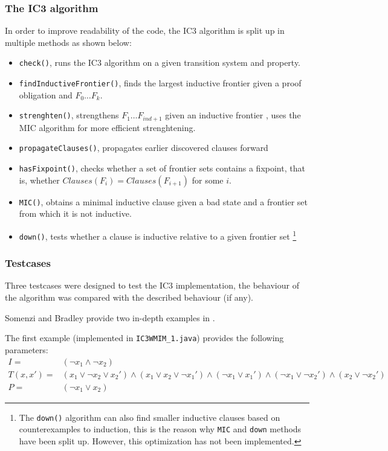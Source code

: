 \documentclass[a4paper]{article}
\begin{document}
\subsubsection{The IC3 algorithm}
In order to improve readability of the code, the IC3 algorithm is split up in multiple methods as shown below:

\begin{itemize}
\item \texttt{check()}, runs the IC3 algorithm on a given transition system and property.
\item \texttt{findInductiveFrontier()}, finds the largest inductive frontier given a proof obligation and $F_0 \ldots F_k$.
\item \texttt{strenghten()}, strengthens $F_1 \ldots F_{ind+1}$ given an inductive frontier	, uses the MIC algorithm for more efficient strenghtening.
\item \texttt{propagateClauses()}, propagates earlier discovered clauses forward
\item \texttt{hasFixpoint()}, checks whether a set of frontier sets contains a fixpoint, that is, whether $Clauses(F_i) = Clauses(F_{i+1})$ for some $i$.
\item \texttt{MIC()}, obtains a minimal inductive clause given a bad state and a frontier set from which it is not inductive.
\item \texttt{down()}, tests whether a clause is inductive relative to a given frontier set \footnote{The \texttt{down()} algorithm can also find smaller inductive clauses based on counterexamples to induction, this is the reason why \texttt{MIC} and \texttt{down} methods have been split up. However, this optimization has not been implemented.}
\end{itemize}

\subsubsection{Testcases}
\label{sec:ic3_testcases}
Three testcases were designed to test the IC3 implementation, the behaviour of the algorithm was compared with the described behaviour (if any).

Somenzi and Bradley provide two in-depth examples in \cite{Somenzi2011}.

The first example (implemented in \texttt{IC3WMIM\_1.java}) provides the following parameters:
\begin{align*}
I =& (\lnot x_1 \land \lnot x_2)\\
T(x,x') =& (x_1 \lor \lnot x_2 \lor x_2') \land (x_1 \lor x_2 \lor \lnot x_1') \land (\lnot x_1 \lor x_1') \land (\lnot x_1 \lor \lnot x_2') \land (x_2 \lor \lnot x_2') \\
P =& (\lnot x_1 \lor x_2)
\end{align*}
\end{document}
